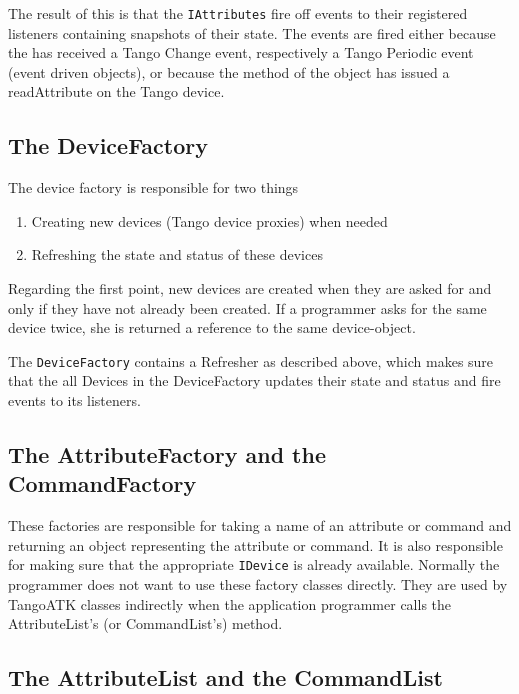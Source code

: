 The result of this is that the \texttt{IAttributes} fire off events
to their registered listeners containing snapshots
of their state. The events are fired either because the 
has received a Tango Change event, respectively a Tango Periodic event
(event driven objects), or because the  method of
the object has issued a readAttribute on the Tango device.


\subsection{The DeviceFactory}

The device factory is responsible for two things
\begin{enumerate}
\item Creating new devices (Tango device proxies) when needed 
\item Refreshing the state and status of these devices 
\end{enumerate}
Regarding the first point, new devices are created when they are asked
for and only if they have not already been created. If a programmer
asks for the same device twice, she is returned a reference to the
same device-object.

The \texttt{DeviceFactory} contains a Refresher as described above,
which makes sure that the all \textsf{Devices} in the \textsf{DeviceFactory}
updates their state and status and fire events to its listeners.


\subsection{The AttributeFactory and the CommandFactory}

These factories are responsible for taking a name of an attribute
or command and returning an object representing the attribute or command.
It is also responsible for making sure that the appropriate \texttt{IDevice}
is already available. Normally the programmer does not want to use
these factory classes directly. They are used by TangoATK classes
indirectly when the application programmer calls the AttributeList's
(or CommandList's)  method.


\subsection{The AttributeList and the CommandList}


